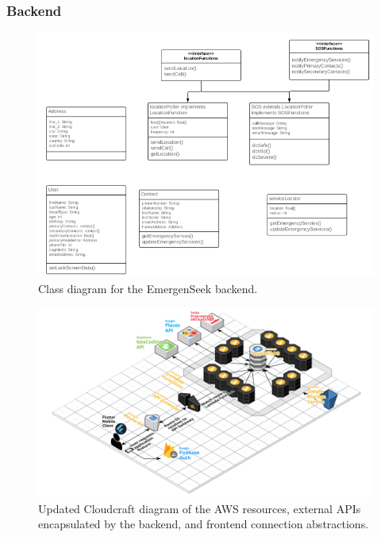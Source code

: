 \documentclass[10pt, a4paper]{article}
\begin{document}
\subsubsection{Backend}
\begin{figure}[H]
\begin{center}
\centerline{
	\includegraphics[scale=1.3]{final-diagrams/backend-class.PNG}
}
\caption{Class diagram for the EmergenSeek backend.}
\end{center}	
\end{figure}

\begin{figure}[H]
\begin{center}
\centerline{
	\includegraphics[scale=.2]{EmergenSeek-Backend.PNG}
}
\caption{Updated Cloudcraft diagram of the AWS resources, external APIs encapsulated by the backend, and frontend connection abstractions.}
\end{center}	
\end{figure}
\end{document}
